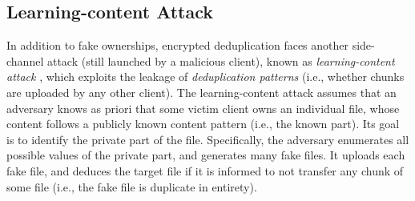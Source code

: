 



\subsection{Learning-content Attack}
\label{sub:attack}

In addition to fake ownerships, encrypted deduplication faces another side-channel attack (still launched by a malicious client), known as {\em learning-content attack} \cite{harnik10, zuo18}, which exploits the leakage of {\em deduplication patterns} (i.e., whether chunks are uploaded by any other client). The learning-content attack assumes that an adversary knows as priori that some victim client owns an individual file, whose content follows a publicly known content pattern (i.e., the known part). Its goal is to identify the private part of the file. Specifically, the adversary enumerates all possible values of the private part, and generates many fake files. It  uploads each fake file, and deduces the target file if it is informed  to not transfer any chunk of some file (i.e., the fake file is duplicate in entirety).


